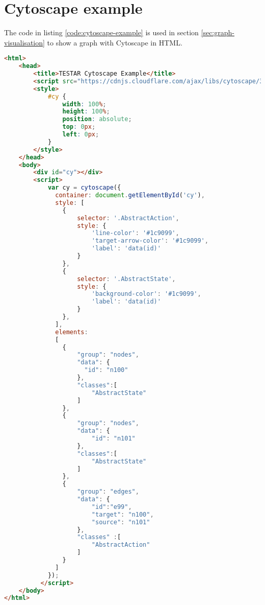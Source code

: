 \chapter{Cytoscape example} \label{appendix:cytoscape-example}

The code in listing \ref{code:cytoscape-example} is used in section \ref{sec:graph-visualisation} to show a graph with Cytoscape in HTML.

\begin{lstlisting}[language=html,basicstyle=\tiny, caption=Graph representation in JSON, label=code:cytoscape-example]
<html>
    <head>
        <title>TESTAR Cytoscape Example</title>
        <script src="https://cdnjs.cloudflare.com/ajax/libs/cytoscape/3.5.2/cytoscape.min.js"></script>
        <style>
            #cy {
                width: 100%;
                height: 100%;
                position: absolute;
                top: 0px;
                left: 0px;
            }
        </style>
    </head>
    <body>
        <div id="cy"></div>
        <script>
            var cy = cytoscape({
              container: document.getElementById('cy'),
              style: [
                {
                    selector: '.AbstractAction',
                    style: {
                        'line-color': '#1c9099',
                        'target-arrow-color': '#1c9099',
                        'label': 'data(id)'
                    }
                },
                {
                    selector: '.AbstractState',
                    style: {
                        'background-color': '#1c9099',
                        'label': 'data(id)'
                    }
                },
              ],
              elements: 
              [
                {
                    "group": "nodes",
                    "data": {
                      "id": "n100" 
                    },
                    "classes":[
                        "AbstractState"
                    ]
                },
                {
                    "group": "nodes",
                    "data": {
                        "id": "n101"
                    },
                    "classes":[
                        "AbstractState"
                    ]
                },
                {
                    "group": "edges",
                    "data": {
                        "id":"e99",
                        "target": "n100",
                        "source": "n101"
                    },
                    "classes" :[
                        "AbstractAction"
                    ]
                }
              ]
            });
          </script>
    </body>
</html>
\end{lstlisting}